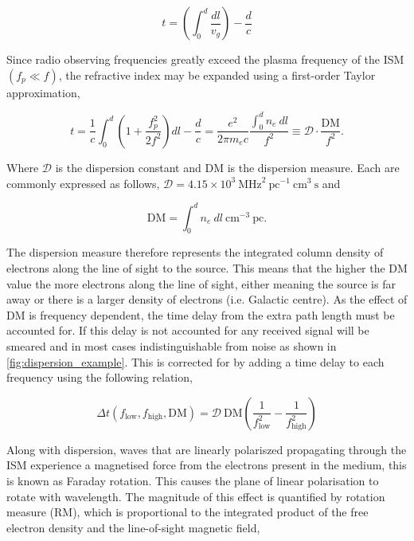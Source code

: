 \begin{equation}
    t = \left( \int^d_0 \frac{dl}{v_g} \right) - \frac{d}{c}
\end{equation}

Since radio observing frequencies greatly exceed the plasma frequency of the ISM $(f_p \ll f)$, the refractive index may be expanded using a first-order Taylor approximation,

\begin{equation}
    t = \frac{1}{c} \int^d_0 \left(1 + \frac{f_p^2}{2f^2} \right) dl - \frac{d}{c}  = \frac{e^2}{2 \pi m_e c} \dfrac{\int^d_0 n_e ~dl}{f^2} \equiv \mathcal{D} \cdot \dfrac{\text{DM}}{f^2}. 
\end{equation}

Where $\mathcal{D}$ is the dispersion constant and $\text{DM}$ is the dispersion measure. Each are commonly expressed as follows, $\mathcal{D}= 4.15 \times 10^3 ~\text{MHz}^2 ~\text{pc}^{-1} ~ \text{cm}^3 ~\text{s}$ and 

\begin{equation}
\boxed{
\text{DM} = \int^d_0 n_e ~dl ~\text{cm}^{-3} ~\text{pc}.
}
\end{equation}

The dispersion measure therefore represents the integrated column density of electrons along the line of sight to the source. This means that the higher the DM value the more electrons along the line of sight, either meaning the source is far away or there is a larger density of electrons (i.e. Galactic centre). As the effect of DM is frequency dependent, the time delay from the extra path length must be accounted for. If this delay is not accounted for any received signal will be smeared and in most cases indistinguishable from noise as shown in \cref{fig:dispersion_example}. This is corrected for by adding a time delay to each frequency using the following relation, 

\begin{equation}
    \Delta t (f_{\text{low}}, f_{\text{high}}, \text{DM}) = \mathcal{D}~\text{DM} \left(\frac{1}{f^2_{\text{low}}} - \frac{1}{f^2_{\text{high}}} \right)
\end{equation}

Along with dispersion, waves that are linearly polariszed propagating through the ISM experience a magnetised force from the electrons present in the medium, this is known as Faraday rotation. This causes the plane of linear polarisation to rotate with wavelength. The magnitude of this effect is quantified by rotation measure (RM), which is proportional to the integrated product of the free electron density and the line-of-sight magnetic field,

